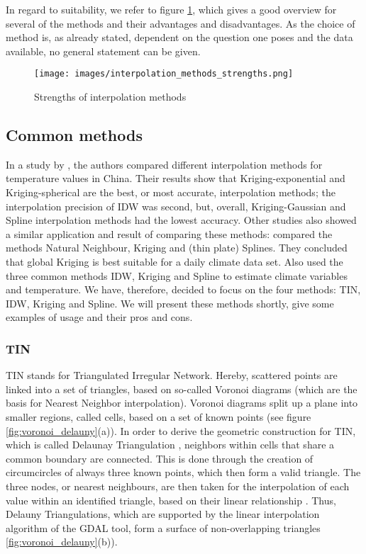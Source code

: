 In regard to suitability, we refer to figure \ref{fig:interpolation_methods_strengths}, which gives a good overview for several of the methods and their advantages and disadvantages. As the choice of method is, as already stated, dependent on the question one poses and the data available, no general statement can be given.


\begin{figure}[b!]
	\texttt{[image: images/interpolation\_methods\_strengths.png]}
	\caption{Strengths of interpolation methods \cite{wasser_going_2020}}
	\label{fig:interpolation_methods_strengths}
\end{figure}

\subsection{Common methods}

In a study by \citeauthor{wenjing_cao_study_2009}, the authors compared different interpolation methods for temperature values in China. Their results show that Kriging-exponential and Kriging-spherical are the best, or most accurate, interpolation methods; the interpolation precision of IDW was second, but, overall, Kriging-Gaussian and Spline interpolation methods had the lowest accuracy. \cite{wenjing_cao_study_2009} Other studies also showed a similar application and result of comparing these methods: 
\citeauthor{hofstra_comparison_2008} compared the methods Natural Neighbour, Kriging and (thin plate) Splines. They concluded that global Kriging is best suitable for a daily climate data set. Also \citeauthor{samanta_interpolation_2012} used the three common methods IDW, Kriging and Spline to estimate climate variables and temperature.
We have, therefore, decided to focus on the four methods: TIN, IDW, Kriging and Spline. We will present these methods shortly, give some examples of usage and their pros and cons.

\subsubsection{TIN}

TIN stands for \ldq{}Triangulated Irregular Network\rdq{}. Hereby, scattered points are linked into a set of triangles, based on so-called \ldq{}Voronoi diagrams\rdq{} (which are the basis for Nearest Neighbor interpolation). Voronoi diagrams split up a plane into smaller regions, called cells, based on a set of known points (see figure \ref{fig:voronoi_delauny}(a)). In order to derive the geometric construction for TIN, which is called \ldq{}Delaunay Triangulation\rdq{} \cite{sambridge_geophysical_1995}, neighbors within cells that share a common boundary are connected. This is done through the creation of circumcircles of always three known points, which then form a valid triangle. The three nodes, or nearest neighbours, are then taken for the interpolation of each value within an identified triangle, based on their linear relationship \cite{lam_spatial_2009}. Thus, Delauny Triangulations, which are supported by the linear interpolation algorithm of the GDAL tool, form a surface of non-overlapping triangles \ref{fig:voronoi_delauny}(b)). 


